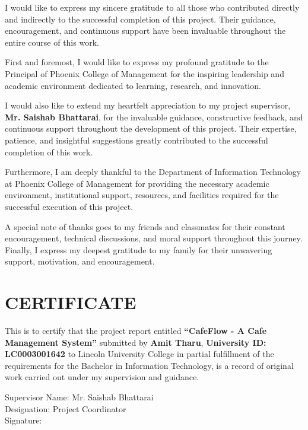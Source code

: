 \documentclass[12pt,a4paper]{report}
\newcommand{\fyptitle}{CafeFlow - A Cafe Management System}
\begin{document}
I would like to express my sincere gratitude to all those who contributed directly and
indirectly to the successful completion of this project. Their guidance, encouragement, and
continuous support have been invaluable throughout the entire course of this work.

First and foremost, I would like to express my profound gratitude to the Principal of
Phoenix College of Management for the inspiring leadership and academic environment dedicated
to learning, research, and innovation.

I would also like to extend my heartfelt appreciation to my project supervisor,
\textbf{Mr. Saishab Bhattarai}, for the invaluable guidance, constructive feedback, and
continuous support throughout the development of this project. Their expertise, patience, and
insightful suggestions greatly contributed to the successful completion of this work.

Furthermore, I am deeply thankful to the Department of Information Technology at Phoenix
College of Management for providing the necessary academic environment, institutional
support, resources, and facilities required for the successful execution of this project.

A special note of thanks goes to my friends and classmates for their constant encouragement,
technical discussions, and moral support throughout this journey. Finally, I express my
deepest gratitude to my family for their unwavering support, motivation, and encouragement.

\chapter*{CERTIFICATE}
\thispagestyle{plain}

This is to certify that the project report entitled \textbf{``\fyptitle''} submitted by
\textbf{Amit Tharu}, \textbf{University ID: LC0003001642} to Lincoln University College in
partial fulfillment of the requirements for the Bachelor in Information Technology, is a
record of original work carried out under my supervision and guidance.

\vspace{14mm}
Supervisor Name: Mr. Saishab Bhattarai \\
Designation: Project Coordinator \\
Signature:

\tableofcontents
\listoffigures
{}
\begingroup
\let\clearpage\relax
\listoftables
\endgroup
{}
\end{document}

